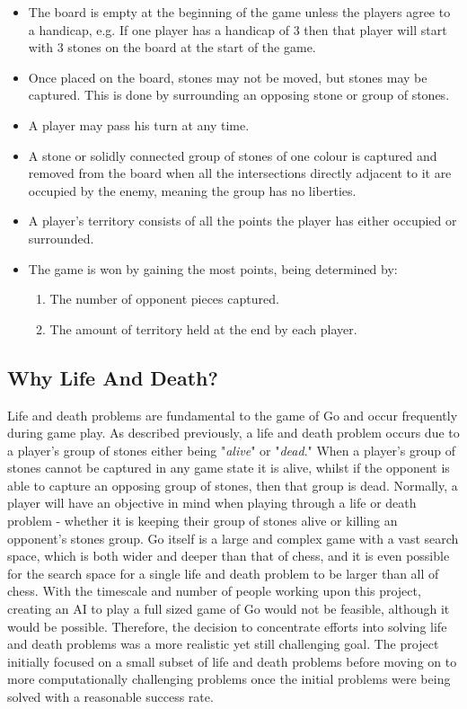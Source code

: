\documentclass{l3proj}
\begin{document}
\begin{itemize}
\item The board is empty at the beginning of the game unless the players agree to a handicap, e.g. If one player has a handicap of 3 then that player will start with 3 stones on the board at the start of the game.
\item Once placed on the board, stones may not be moved, but stones may be captured. This is done by surrounding an opposing stone or group of stones. 
\item A player may pass his turn at any time.
\item A stone or solidly connected group of stones of one colour is captured and removed from the board when all the intersections directly adjacent to it are occupied by the enemy, meaning the group has no liberties.
\item A player's territory consists of all the points the player has either occupied or surrounded.
\item  The game is won by gaining the most points, being determined by:
\begin{enumerate}
\item The number of opponent pieces captured.
\item The amount of territory held at the end by each player.
\end{enumerate}
\end{itemize}

\subsection{Why Life And Death?}

Life and death problems are fundamental to the game of Go and occur frequently during game play. As described previously, a life and death problem occurs due to a player's group of stones either being "\textit{alive}" or "\textit{dead}." When a player's group of stones cannot be captured in any game state it is alive, whilst if the opponent is able to capture an opposing group of stones, then that group is dead. Normally, a player will have an objective in mind when playing through a life or death problem - whether it is keeping their group of stones alive or killing an opponent's stones group. Go itself is a large and complex game with a vast search space, which is both wider and deeper than that of chess, and it is even possible for the search space for a single life and death problem to be larger than all of chess. With the timescale and number of people working upon this project, creating an AI to play a full sized game of Go would not be feasible, although it would be possible. Therefore, the decision to concentrate efforts into solving life and death problems was a more realistic yet still challenging goal. The project initially focused on a small subset of life and death problems before moving on to more computationally challenging problems once the initial problems were being solved with a reasonable success rate.
\end{document}
